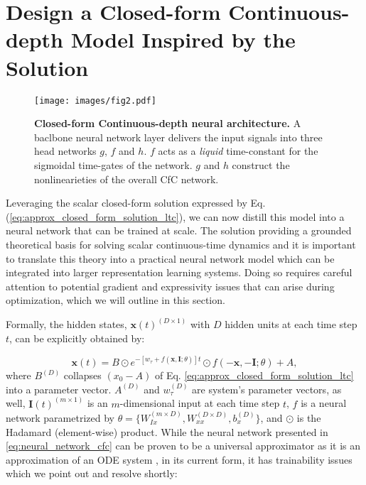 \documentclass[12pt]{article}
\begin{document}
\section*{Design a Closed-form Continuous-depth Model Inspired by the Solution}

\begin{figure*}[t]
	\centering
	\texttt{[image: images/fig2.pdf]}
	\caption{\textbf{Closed-form Continuous-depth neural architecture.} A baclbone neural network layer delivers the input signals into three head networks $g$, $f$ and $h$. $f$ acts as a \emph{liquid} time-constant for the sigmoidal time-gates of the network. $g$ and $h$ construct the nonlinearieties of the overall CfC network.}
	\label{fig:cfc}
\end{figure*}

Leveraging the scalar closed-form solution expressed by Eq. (\ref{eq:approx_closed_form_solution_ltc}), we can now distill this model into a neural network that can be trained at scale. The solution providing a grounded theoretical basis for solving scalar continuous-time dynamics and it is important to translate this theory into a practical neural network model which can be integrated into larger representation learning systems. Doing so requires careful attention to potential gradient and expressivity issues that can arise during optimization, which we will outline in this section. 

\noindent Formally, the hidden states, $\textbf{x}(t)^{(D \times 1)}$ with $D$ hidden units at each time step $t$, can be explicitly obtained by:

\begin{equation}
\label{eq:neural_network_cfc}
\textbf{x}(t) = B \odot e^{-[w_\tau + f(\textbf{x}, \textbf{I};\theta)] t} \odot f(-\textbf{x},-\textbf{I};\theta) + A,
\end{equation}
where $B^{(D)}$ collapses $(x_0-A)$ of Eq. \ref{eq:approx_closed_form_solution_ltc} into a parameter vector. $A^{(D)}$ and $w_{\tau}^{(D)}$ are system's parameter vectors, as well, $\textbf{I}(t)^{(m \times 1)}$ is an $m$-dimensional input at each time step $t$, $f$ is a neural network parametrized by $\theta = \{ W_{Ix}^{(m \times D)}, W_{xx}^{(D \times D)}, b_{x}^{(D)} \}$, and $\odot$ is the Hadamard (element-wise) product. 
While the neural network presented in \ref{eq:neural_network_cfc} can be proven to be a universal approximator as it is an approximation of an ODE system \cite{chen2018neural,hasani2021liquid}, in its current form, it has trainability issues which we point out and resolve shortly:
\end{document}
